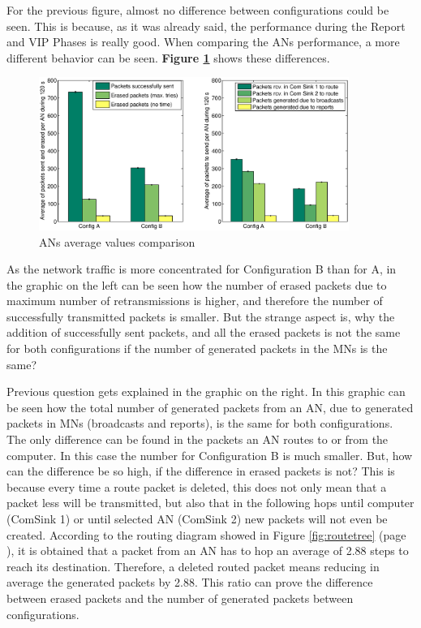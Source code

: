 For the previous figure, almost no difference between configurations could be seen. This is because, as it was already said, the performance
during the Report and \ac{VIP} Phases is really good. When comparing the \acp{AN} performance, a more different behavior can be seen. 
\textbf{Figure \ref{fig:ANsConparison}} shows these differences. 

\begin{figure}[ht]
 \begin{center}
  \includegraphics[width=0.9\textwidth]{ANsConparison.eps}
 \end{center}
 \caption{\acp{AN} average values comparison}
 \label{fig:ANsConparison}
\end{figure}

As the network traffic is more concentrated for Configuration B than for A, in the graphic on the left can be seen how the number of erased 
packets due to maximum number of retransmissions is higher, and therefore the number of successfully transmitted packets is smaller. But the 
strange aspect is, why the addition of successfully sent packets, and all the erased packets is not the same for both configurations if the 
number of generated packets in the \acp{MN} is the same? 

Previous question gets explained in the graphic on the right. In this graphic can be seen how the total number of generated packets from an 
\ac{AN}, due to generated packets in \acp{MN} (broadcasts and reports), is the same for both configurations. The only difference can be 
found in the packets an \ac{AN} routes to or from the computer. In this case the number for Configuration B is much smaller. But, how can 
the difference be so high, if the difference in erased packets is not? This is because every time a route packet is deleted, this does not only
mean that a packet less will be transmitted, but also that in the following hops until computer (ComSink 1) or until selected \ac{AN} (ComSink
2) new packets will not even be created. According to the routing diagram showed in Figure \ref{fig:routetree} (page \pageref{fig:routetree}), it is
obtained that a packet from an \ac{AN} has to hop an average of 2.88 steps to reach its destination. Therefore, a deleted 
routed packet means reducing in average the generated packets by 2.88. This ratio can prove the difference between erased packets
and the number of generated packets between configurations.

